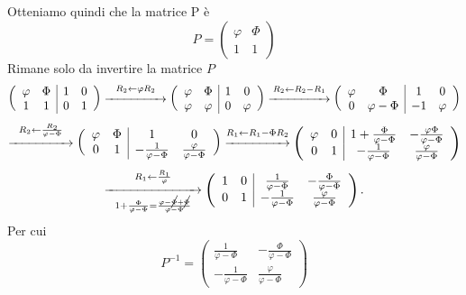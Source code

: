 \documentclass{article}     %
\begin{document}
Otteniamo quindi che la matrice P è
\[P = \begin{pmatrix} \varphi &\Phi\\1&1 \end{pmatrix} \]
Rimane solo da invertire la matrice $P$
\[
    \left(\begin{array}{cc|cc} \varphi&\Phi&1&0\\1& 1 &0&1\end{array}\right) 
    \overset{R_2\leftarrow \varphi R_2}{\xrightarrow{\hspace{1.6cm}}}
    \left(\begin{array}{cc|cc} \varphi&\Phi&1&0\\\varphi& \varphi &0&\varphi\end{array}\right)
    \overset{R_2\leftarrow R_2 - R_1}{\xrightarrow{\hspace{1.6cm}}}
    \left(\begin{array}{cc|cc} \varphi&\Phi&1&0\\0& \varphi - \Phi &- 1&\varphi\end{array}\right)
\]
\[ 
    \overset{R_2\leftarrow \frac{R_2}{\varphi - \Phi}}{\xrightarrow{\hspace{1.6cm}}}
    \left(\begin{array}{cc|cc} \varphi&\Phi&1&0\\0& 1 &- \frac{1}{\varphi - \Phi}&\frac{\varphi}{\varphi -\Phi}\end{array}\right)
    \overset{R_1\leftarrow R_1 -\Phi R_2}{\xrightarrow{\hspace{1.6cm}}}
    \left(\begin{array}{cc|cc} \varphi&0&1 +\frac{\Phi}{\varphi -\Phi}&-\frac{\varphi\Phi}{\varphi -\Phi}\\0& 1 &- \frac{1}{\varphi - \Phi}&\frac{\varphi}{\varphi -\Phi}\end{array}\right)
\]
\[ 
    \underset{1 +\frac{\Phi}{\varphi -\Phi} =\frac{\varphi -\cancel{\Phi} +\cancel{\Phi}}{\varphi -\Phi}}{\overset{R_1\leftarrow \frac{R_1}{\varphi}}{\xrightarrow{\hspace{2.5cm}}}}
    \left(\begin{array}{cc|cc} 1&0&\frac{1}{\varphi -\Phi}&-\frac{\Phi}{\varphi -\Phi}\\0& 1 &- \frac{1}{\varphi - \Phi}&\frac{\varphi}{\varphi -\Phi}\end{array}\right) .
\]
Per cui 
\[P^{ - 1} = \begin{pmatrix} \frac{1}{\varphi -\Phi}&-\frac{\Phi}{\varphi -\Phi}\\- \frac{1}{\varphi - \Phi}&\frac{\varphi}{\varphi -\Phi} \end{pmatrix} \]
\end{document}
